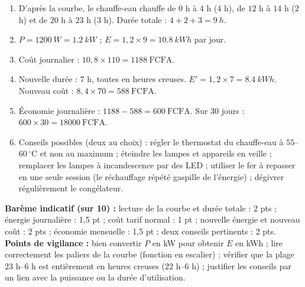 \documentclass[11pt]{article}
\begin{document}
\begin{corrige}
\begin{enumerate}
\item D'après la courbe, le chauffe-eau chauffe de $0$ h à $4$ h ($4$ h), de $12$ h à $14$ h ($2$ h) et de $20$ h à $23$ h ($3$ h). Durée totale : $4 + 2 + 3 = \SI{9}{h}$.
\item $P = \SI{1200}{W} = \SI{1,2}{kW}$ ; $E = 1,2 \times 9 = \SI{10,8}{kWh}$ par jour.
\item Coût journalier : $10,8 \times 110 = \SI{1188}{\text{FCFA}}$.
\item Nouvelle durée : $7$ h, toutes en heures creuses. $E' = 1,2 \times 7 = \SI{8,4}{kWh}$. Nouveau coût : $8,4 \times 70 = \SI{588}{\text{FCFA}}$.
\item Économie journalière : $1188 - 588 = \SI{600}{\text{FCFA}}$. Sur $30$ jours : $600 \times 30 = \SI{18000}{\text{FCFA}}$.
\item Conseils possibles (deux au choix) : régler le thermostat du chauffe-eau à $55$--$60\,^\circ\text{C}$ et non au maximum ; éteindre les lampes et appareils en veille ; remplacer les lampes à incandescence par des LED ; utiliser le fer à repasser en une seule session (le réchauffage répété gaspille de l'énergie) ; dégivrer régulièrement le congélateur.
\end{enumerate}
\textbf{Barème indicatif (sur 10) :} lecture de la courbe et durée totale : 2 pts ; énergie journalière : 1,5 pt ; coût tarif normal : 1 pt ; nouvelle énergie et nouveau coût : 2 pts ; économie mensuelle : 1,5 pt ; deux conseils pertinents : 2 pts.
\textbf{Points de vigilance :} bien convertir $P$ en kW pour obtenir $E$ en kWh ; lire correctement les paliers de la courbe (fonction en escalier) ; vérifier que la plage $23$ h--$6$ h est entièrement en heures creuses ($22$ h--$6$ h) ; justifier les conseils par un lien avec la puissance ou la durée d'utilisation.
\end{corrige}
\end{document}
